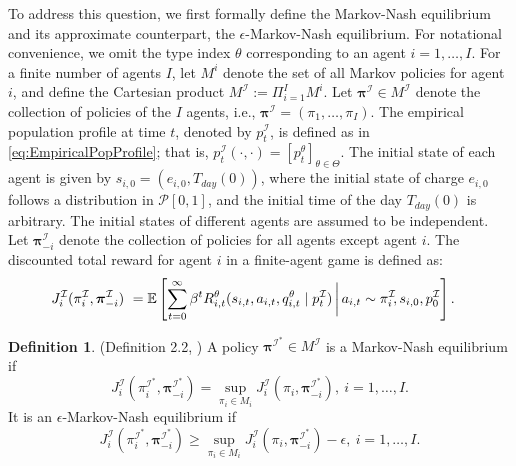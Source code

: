 \documentclass{article}
\theoremstyle{definition}
\newtheorem{definition}{Definition}
\theoremstyle{plain}
\begin{document}
To address this question, we first formally define the Markov-Nash equilibrium and its approximate counterpart, the $\epsilon$-Markov-Nash equilibrium. For notational convenience, we omit the type index $\theta$ corresponding to an agent $i = 1, \ldots, I$. For a finite number of agents $I$, let $M^i$ denote the set of all Markov policies for agent $i$, and define the Cartesian product $M^\mathcal{I} := \Pi_{i=1}^{I} M^i$. Let $\bm{\pi^{\mathcal{I}}} \in M^\mathcal{I}$ denote the collection of policies of the $I$ agents, i.e., $\bm{\pi^{\mathcal{I}}} = (\pi_1, \ldots, \pi_I)$. The empirical population profile at time $t$, denoted by $p_t^{\mathcal{I}}$, is defined as in \eqref{eq:EmpiricalPopProfile}; that is, $p_t^{\mathcal{I}}(\cdot, \cdot) = [p_t^{\theta}]_{\theta\in\Theta}.$
The initial state of each agent is given by $s_{i,0} = (e_{i,0}, T_{day}(0))$, where the initial state of charge $e_{i,0}$ follows a distribution in $\mathcal{P}[0,1]$, and the initial time of the day $T_{day}(0)$ is arbitrary. The initial states of different agents are assumed to be independent.
Let $\bm{\pi}^{\mathcal{I}}_{-i}$ denote the collection of policies for all agents except agent $i$. The discounted total reward for agent $i$ in a finite-agent game is defined as:
\begin{align}
& J_i^{\mathcal{I}}(\pi^{\mathcal{I}}_i, \bm{\pi}^{\mathcal{I}}_{-i}) \ = \mathbb{E}\left[  \sum_{t=0}^{\infty} \beta^t 
R^{\theta}_{i,t}(s_{i,t}, a_{i,t}, q^{\theta}_{i,t} \mid p^{\mathcal{I}}_{t}) \,\bigg|\, a_{i,t} \sim \pi^{\mathcal{I}}_{i} \hspace*{-2pt}, s_{i,0},  p^{\mathcal{I}}_{0}\right].  \nonumber
\end{align} 

\begin{definition} (Definition 2.2, \cite{MarkovNash}) 
	A policy  $\bm{\pi}^{\mathcal{I}^*} \in M^{\mathcal{I}}$ is a Markov-Nash equilibrium if 
	\begin{equation}\label{eq:MNash}
	J_i^{\mathcal{I}}(\pi^{\mathcal{I^*}}_i, \bm{\pi}^{\mathcal{I}^*}_{-i}) = \sup_{\pi_i \in M_i} J_i^{\mathcal{I}}(\pi_i, \bm{\pi}^{\mathcal{I^*}}_{-i}),\ i=1, \ldots, I. 
	\end{equation}
	It is an $\epsilon$-Markov-Nash equilibrium if 
	\begin{equation}\label{eq:MNash_epsilon}
	J_i^{\mathcal{I}}(\pi^{\mathcal{I^*}}_i, \bm{\pi}^{\mathcal{I}^*}_{-i}) \geq \sup_{\pi_i \in M_i} J_i^{\mathcal{I}}(\pi_i, \bm{\pi}^{\mathcal{I^*}}_{-i}) - \epsilon,\ i=1, \ldots, I. 
	\end{equation}
\end{definition}
\end{document}
